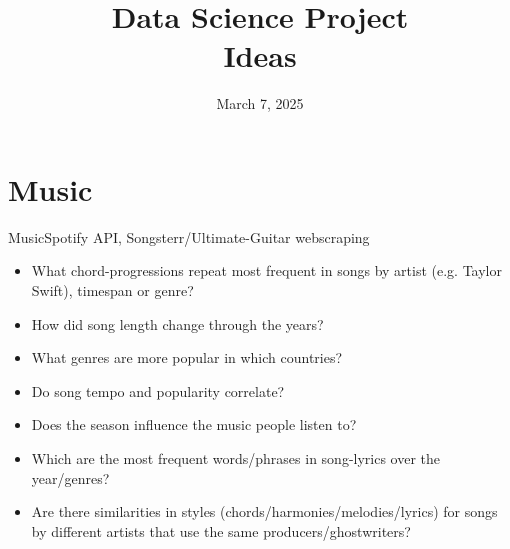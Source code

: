 

\title[Data Science Project: Ideas]{Data Science Project \\ \small Ideas}
\date{March 7, 2025}


    \maketitle
    

    \section{Music}
    \begin{frame}{Music}{Spotify API, Songsterr/Ultimate-Guitar webscraping}
        \begin{itemize}[<+->]
            \item What chord-progressions repeat most frequent in songs by artist (e.g. Taylor Swift), timespan or genre?
            \item How did song length change through the years?
            \item What genres are more popular in which countries?
            \item Do song tempo and popularity correlate?
            \item Does the season influence the music people listen to?
            \item Which are the most frequent words/phrases in song-lyrics over the year/genres?
            \item Are there similarities in styles (chords/harmonies/melodies/lyrics) for songs by different artists that use the same producers/ghostwriters?
        \end{itemize}
    \end{frame}

